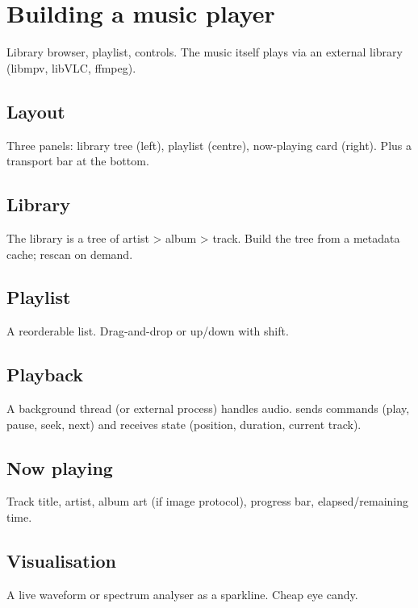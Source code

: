 \chapter{Building a music player}
\label{ch:musicplayer}

\begin{aside}
Library browser, playlist, controls. The music itself plays
via an external library (libmpv, libVLC, ffmpeg).
\end{aside}

\section{Layout}

Three panels: library tree (left), playlist (centre),
now-playing card (right). Plus a transport bar at the
bottom.

\section{Library}

The library is a tree of artist > album > track. Build
the tree from a metadata cache; rescan on demand.

\section{Playlist}

A reorderable list. Drag-and-drop or up/down with shift.

\section{Playback}

A background thread (or external process) handles audio.
\maya{} sends commands (play, pause, seek, next) and
receives state (position, duration, current track).

\section{Now playing}

Track title, artist, album art (if image protocol),
progress bar, elapsed/remaining time.

\section{Visualisation}

A live waveform or spectrum analyser as a sparkline.
Cheap eye candy.

